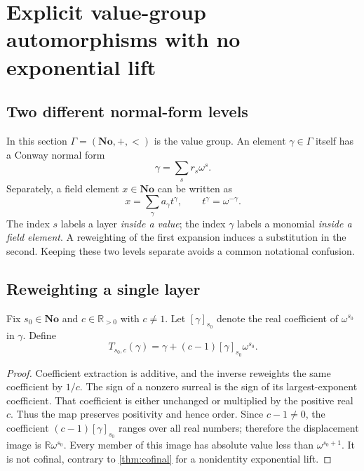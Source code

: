 \documentclass[11pt]{article}
\newtheorem{proposition}[theorem]{Proposition}
\theoremstyle{definition}
\theoremstyle{remark}
\newcommand{\No}{\mathbf{No}}
\newcommand{\R}{\mathbb{R}}
\numberwithin{equation}{section}
\begin{document}
\section{Explicit value-group automorphisms with no exponential lift}
\label{sec:nonlifting}

\subsection{Two different normal-form levels}

In this section $\Gamma=(\No,+,<)$ is the value group. An element
$\gamma\in\Gamma$ itself has a Conway normal form
\[
 \gamma=\sum_s r_s\omega^s.
\]
Separately, a field element $x\in\No$ can be written as
\[
 x=\sum_\gamma a_\gamma t^\gamma,
 \qquad t^\gamma=\omega^{-\gamma}.
\]
The index $s$ labels a layer \emph{inside a value}; the index $\gamma$ labels
a monomial \emph{inside a field element}. A reweighting of the first
expansion induces a substitution in the second. Keeping these two levels
separate avoids a common notational confusion.

\subsection{Reweighting a single layer}

Fix $s_0\in\No$ and $c\in\R_{>0}$ with $c\ne1$. Let
$[\gamma]_{s_0}$ denote the real coefficient of $\omega^{s_0}$ in $\gamma$.
Define
\begin{equation}\label{eq:single-layer}
 T_{s_0,c}(\gamma)
  =\gamma+(c-1)[\gamma]_{s_0}\omega^{s_0}.
\end{equation}

\begin{proof}
Coefficient extraction is additive, and the inverse reweights the same
coefficient by $1/c$. The sign of a nonzero surreal is the sign of its
largest-exponent coefficient. That coefficient is either unchanged or
multiplied by the positive real $c$. Thus the map preserves positivity
and hence order.
Since $c-1\ne0$, the coefficient $(c-1)[\gamma]_{s_0}$ ranges over all
real numbers; therefore the displacement image is $\R\omega^{s_0}$.
Every member of this image has absolute value less than
$\omega^{s_0+1}$. It is not cofinal, contrary to \cref{thm:cofinal} for a
nonidentity exponential lift.
\end{proof}
\end{document}
